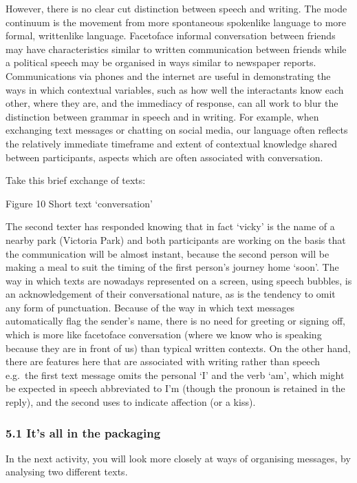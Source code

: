 \documentclass[letterpaper,10pt,english]{sphinxmanual}
\let\sphinxpxdimen\pdfpxdimen\else\newdimen\sphinxpxdimen
\begin{document}
However, there is no clear cut distinction between speech and writing. The mode continuum is the movement from more spontaneous spoken\sphinxhyphen{}like language to more formal, written\sphinxhyphen{}like language. Face\sphinxhyphen{}to\sphinxhyphen{}face informal conversation between friends may have characteristics similar to written communication between friends while a political speech may be organised in ways similar to newspaper reports. Communications via phones and the internet are useful in demonstrating the ways in which contextual
variables, such as how well the interactants know each other, where they are, and the immediacy of response, can all work to blur the distinction between grammar in speech and in writing. For example, when exchanging text messages or chatting on social media, our language often reflects the relatively immediate timeframe and extent of contextual knowledge shared between participants, aspects which are often associated with conversation.

Take this brief exchange of texts:

\sphinxincludegraphics[width=229\sphinxpxdimen,height=107\sphinxpxdimen]{{e304_ol_s5_fig009}.jpg}

Figure 10 Short text ‘conversation’

The second texter has responded knowing that in fact ‘vicky’ is the name of a nearby park (Victoria Park) and both participants are working on the basis that the communication will be almost instant, because the second person will be making a meal to suit the timing of the first person’s journey home ‘soon’. The way in which texts are nowadays represented on a screen, using speech bubbles, is an acknowledgement of their conversational nature, as is the tendency to omit any form of punctuation.
Because of the way in which text messages automatically flag the sender’s name, there is no need for greeting or signing off, which is more like face\sphinxhyphen{}to\sphinxhyphen{}face conversation (where we know who is speaking because they are in front of us) than typical written contexts. On the other hand, there are features here that are associated with writing rather than speech \textendash{} e.g. the first text message omits the personal  ‘I’ and the verb ‘am’, which might be expected in speech abbreviated to I’m
(though the pronoun is retained in the reply), and the second uses to indicate affection (or a kiss).


\subsubsection{5.1 It’s all in the packaging}
\label{\detokenize{content/session_00/Part_00_05:5.1-It_u2019s-all-in-the-packaging}}
In the next activity, you will look more closely at ways of organising messages, by analysing two different texts.
\end{document}
